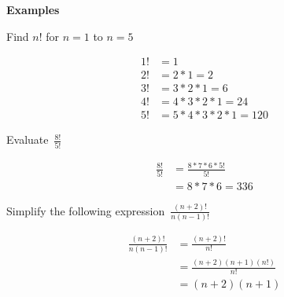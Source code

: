 \documentclass[addpoints]{exam}
\begin{document}
    \vspace{0.2in}
    \Large\textbf{Examples}\normalsize
    \begin{questions}
      \question Find $n\textbf{!}$ for $n=1$ to $n=5$
      \begin{solution}[\stretch{1}]
        \begin{align*}
          1\textbf{!} &= 1 \\ 
          2\textbf{!} &= 2 * 1 = 2 \\ 
          3\textbf{!} &= 3 * 2 * 1 = 6 \\ 
          4\textbf{!} &= 4 * 3 * 2 * 1 = 24 \\ 
          5\textbf{!} &= 5 * 4 * 3 * 2 * 1 = 120
        \end{align*}
      \end{solution}

      \question Evaluate $\displaystyle\,\frac{8\textbf{!}}{5\textbf{!}}$
      \begin{solution}[\stretch{1}]
        \begin{align*}
          \frac{8\textbf{!}}{5\textbf{!}} &= \frac{8 * 7 * 6 * 5\textbf{!}}{5\textbf{!}} \\ 
          &= 8 * 7 * 6 = 336
        \end{align*}
      \end{solution}

      \question Simplify the following expression $\displaystyle\,\frac{\left(n+2\right)\textbf{!}}{n\left(n-1\right)\textbf{!}}$
      \begin{solution}[\stretch{1}]
        \begin{align*}
          \frac{\left(n+2\right)\textbf{!}}{n\left(n-1\right)\textbf{!}} &= \frac{\left(n+2\right)\textbf{!}}{n\textbf{!}} \\ 
          &= \frac{\left(n+2\right)\left(n+1\right)\left(n\textbf{!}\right)}{n\textbf{!}} \\ 
          &= \left(n+2\right)\left(n+1\right)
        \end{align*}
      \end{solution}
    \end{questions}
  
\end{document}
